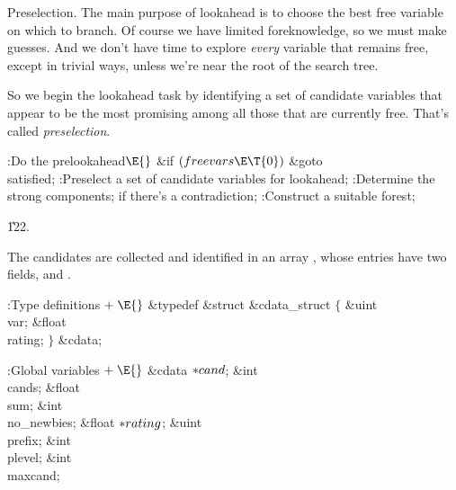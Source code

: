 Preselection. The main purpose of lookahead is to choose
the best
free variable on which to branch. Of course we have limited foreknowledge,
so we must make guesses. And we don't have time to explore {\it every\/}
variable that remains free, except in trivial ways, unless
we're near the root of the search tree.

So we begin the lookahead task by identifying a set of candidate
variables that appear to be the most promising among all those that
are currently free. That's called {\it preselection}.

\Y\B\4:Do the prelookahead\X${}\E{}$\6
\&{if} ${}(\\{freevars}\E\T{0}){}$\1\5
\&{goto} \\{satisfied};\2\6
:Preselect a set of candidate variables for lookahead\X;\6
:Determine the strong components;  if there's a
contradiction\X;\6
:Construct a suitable forest\X;\par
\U122.\fi

The candidates are collected and identified in an array %
, whose
entries have two fields,  and .

\Y\B\4:Type definitions\X${}\mathrel+\E{}$\6
\&{typedef} \&{struct} \&{cdata\_struct} ${}\{{}$\1\6
\&{uint} \\{var};\6
\&{float} \\{rating};\2\6
${}\}{}$ \&{cdata};\par
\fi

\B{}:Global variables\X${}\mathrel+\E{}$\6
\&{cdata} ${}{*}\\{cand}{}$;\6
\&{int} \\{cands};\6
\&{float} \\{sum};\6
\&{int} \\{no\_newbies};\6
\&{float} ${}{*}\\{rating}{}$;\6
\&{uint} \\{prefix};\6
\&{int} \\{plevel};\6
\&{int} \\{maxcand};\par
\fi

